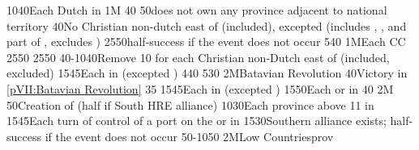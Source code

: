 %
%
{10}{40}{Each Dutch \COL in \continentBrazil}%
%
%
\EUobjective1M{}{}%
{}{40}{}%
%
%
{}{50}{\paysmajeurFrance does not own any province adjacent to
  \paysmajeurHollande national territory}%
%
%
{}{40}{No Christian non-dutch \TP east of \granderegionMalacca (included),
  \continentSiberia excepted (includes ,
  \continentIndonesia, \granderegionPhilippines and part of
  \continentIndochina, excludes \granderegionOceania)}%
%
%
{25}{50}{half-success if the event does not occur}%
%
%
{5}{40}{}%
%
%
\EUobjective1M{Each \CC}{CC}%
{25}{50}{\EU@objEachCC}%
%
%
{25}{50}{\EU@objWoSS}%
%
%
{40-10}{40}{Remove 10 \VPs for each Christian non-Dutch \TP east of
   (included, \continentSiberia excluded)}%
%
%
{15}{45}{Each \COL in  (excepted )}%
%
%
{4}{40}{\EU@objEastIndiesConvoy}%
%
%
%
{5}{30}{\EU@objMonopolyZone}%
%
\EUobjective2M{Batavian Revolution}{}%
{}{40}{Victory in \ref{pVII:Batavian Revolution}}%
%
%
{}{35}{\EU@objFranceContained}%
%
%
{15}{45}{Each \COL in  (excepted )}%
%
%
{15}{50}{Each \COL or \TP in }%
%
 
%
%
{}{40}{\EU@objHalfHungary}%
%
\EUobjective2M{}{}%
{}{50}{Creation of  (half if South HRE alliance)}%
%
%
{10}{30}{Each province above 11 in \paysmajeurAutriche}%
%
%
{15}{45}{Each turn of control of a port on the \seazoneBaltique or in
  \payshanse}%
%
%
{15}{30}{Southern \HRE alliance exists; half-success if the event does not
  occur}%
%
%
%
{50-10}{50}{}%
%
\EUobjective2M{Low Countries}{prov}%
